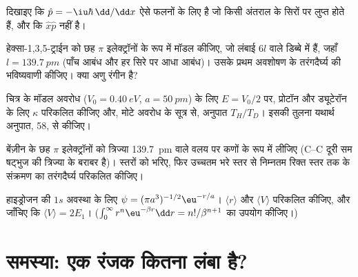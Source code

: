 \begin{exercise}[$\star\star$]\label{exo:b3:quantum-model-systems:8}
दिखाइए कि $\hat p = -\iu\hbar\,\dd/\dd x$ ऐसे फलनों के लिए  है जो
किसी अंतराल के सिरों पर लुप्त होते हैं, और कि $\hat x\hat p$  नहीं है।
\end{exercise}

\begin{exercise}[$\star\star$]\label{exo:b3:quantum-model-systems:9}
हेक्सा-1,3,5-ट्राईन को छह $\pi$ इलेक्ट्रॉनों के रूप में मॉडल कीजिए, जो लंबाई $6l$ वाले डिब्बे में हैं, जहाँ $l =
\qty{139.7}{pm}$ (पाँच आबंध और हर सिरे पर आधा आबंध)। उसके प्रथम अवशोषण के
तरंगदैर्घ्य की भविष्यवाणी कीजिए। क्या अणु रंगीन है?
\end{exercise}

\begin{exercise}[$\star\star\star$]\label{exo:b3:quantum-model-systems:10}
चित्र के मॉडल अवरोध ($V_0 = \qty{0.40}{eV}$, $a = \qty{50}{pm}$) के लिए
$E = V_0/2$ पर, प्रोटॉन और ड्यूटेरॉन के लिए $\kappa$ परिकलित कीजिए और,
मोटे अवरोध के सूत्र से, अनुपात $T_H/T_D$। इसकी तुलना यथार्थ अनुपात, 58, से कीजिए।
\end{exercise}

\begin{exercise}[$\star\star\star$]\label{exo:b3:quantum-model-systems:11}
बेंज़ीन के छह $\pi$ इलेक्ट्रॉनों को त्रिज्या
\qty{139.7}{pm} वाले वलय पर कणों के रूप में लीजिए (C--C दूरी सम षट्भुज की त्रिज्या के बराबर है)।
स्तरों को भरिए, फिर उच्चतम भरे स्तर से निम्नतम रिक्त स्तर तक के संक्रमण का
तरंगदैर्घ्य परिकलित कीजिए।
\end{exercise}

\begin{exercise}[$\star\star\star$]\label{exo:b3:quantum-model-systems:12}
हाइड्रोजन की $1s$ अवस्था के लिए $\psi = (\pi a^3)^{-1/2}\eu^{-r/a}$।  $\langle r\rangle$ और $\langle V\rangle$ परिकलित कीजिए, और जाँचिए कि
$\langle V\rangle = 2E_1$। ($\int_0^\infty r^n\eu^{-\beta r}\dd r =
n!/\beta^{n+1}$ का उपयोग कीजिए।)
\end{exercise}

\section{समस्या: एक रंजक कितना लंबा है?}

